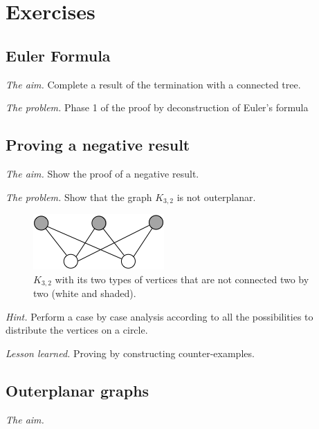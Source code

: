 
\section{Exercises}


\subsection{Euler Formula}

\noindent \textit{The aim.}
Complete a result of the termination with a connected tree.
\medskip

\noindent \textit{The problem.}
Phase 1 of the proof by deconstruction of Euler's formula
\medskip


\subsection{Proving a negative result}

\noindent \textit{The aim.}
Show the proof of a negative result.
\medskip

\noindent \textit{The problem.}
Show that the graph $K_{3,2}$ is not outerplanar.
\begin{figure}[h]
\begin{center}
        \includegraphics[scale=0.4]{FiguresGraph/outerplanarK3,2init}
        \caption{$K_{3,2}$ with its two types of vertices that are not connected two by two (white and shaded).}
\end{center}
\end{figure}
\medskip

\noindent \textit{Hint.}
Perform a case by case analysis according to all the possibilities to distribute the vertices on a circle.
\medskip

\noindent \textit{Lesson learned.}
Proving by constructing counter-examples. 


\subsection{Outerplanar graphs}

\noindent \textit{The aim.}

